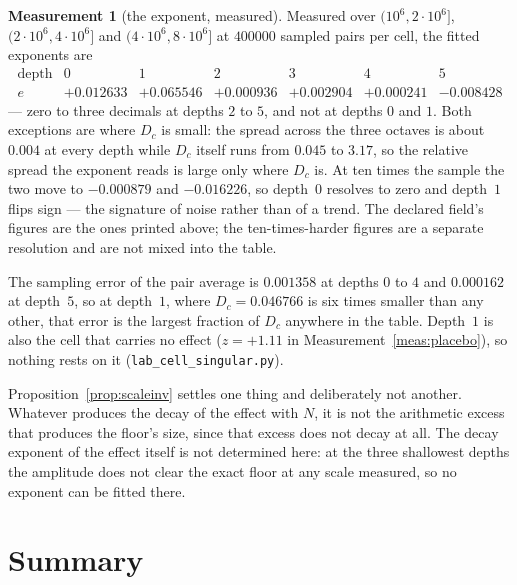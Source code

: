 \documentclass[11pt,a4paper]{article}
\theoremstyle{plain}
\theoremstyle{definition}
\newtheorem{measurement}[theorem]{Measurement}
\theoremstyle{remark}
\begin{document}
\begin{measurement}[the exponent, measured]\label{meas:scaleinv}
Measured over $(10^6,2\cdot10^6]$, $(2\cdot10^6,4\cdot10^6]$ and
$(4\cdot10^6,8\cdot10^6]$ at $400000$ sampled pairs per cell, the
fitted exponents are
\[
\begin{array}{r|cccccc}
 \text{depth} & 0 & 1 & 2 & 3 & 4 & 5\\\hline
 e & +0.012633 & +0.065546 & +0.000936 & +0.002904 & +0.000241
   & -0.008428
\end{array}
\]
--- zero to three decimals at depths $2$ to $5$, and not at depths
$0$ and $1$. Both exceptions are where $D_c$ is small: the spread
across the three octaves is about $0.004$ at every depth while $D_c$
itself runs from $0.045$ to $3.17$, so the relative spread the exponent
reads is large only where $D_c$ is. At ten times the sample the two
move to $-0.000879$ and $-0.016226$, so depth~$0$ resolves to zero and
depth~$1$ flips sign --- the signature of noise rather than of a trend.
The declared field's figures are the ones printed above; the
ten-times-harder figures are a separate resolution and are not mixed
into the table.

The sampling error of the pair average is $0.001358$ at depths $0$ to
$4$ and $0.000162$ at depth~$5$, so at depth~$1$, where
$D_c=0.046766$ is six times smaller than any other, that error is the
largest fraction of $D_c$ anywhere in the table. Depth~$1$ is also the
cell that carries no effect ($z=+1.11$ in
Measurement~\ref{meas:placebo}), so nothing rests on it
(\texttt{lab\_cell\_singular.py}).
\end{measurement}

Proposition~\ref{prop:scaleinv} settles one thing and deliberately not
another. Whatever produces the decay of the effect with $N$, it is not
the arithmetic excess that produces the floor's size, since that
excess does not decay at all. The decay exponent of the effect itself
is not determined here: at the three shallowest depths the amplitude
does not clear the exact floor at any scale measured, so no exponent
can be fitted there.

\section{Summary}
\end{document}
